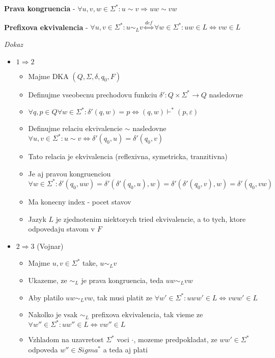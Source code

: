 \documentclass[12pt]{article}
\begin{document}
\textbf{Prava kongruencia} - $\forall u,v,w \in \Sigma^{*}: u \sim v \Rightarrow uw \sim vw$

\textbf{Prefixova ekvivalencia} - $\forall u,v \in \Sigma^{*}: u \sim_{L} v \overset{def}{\Leftrightarrow} \forall w \in \Sigma^{*}: uw \in L \Leftrightarrow vw \in L$

\emph{Dokaz}
\begin{itemize}
	\item $1 \Rightarrow 2$
		\begin{itemize}
			\item Majme DKA $(Q,\Sigma,\delta,q_{0},F)$
			\item Definujme vseobecnu prechodovu funkciu $\delta': Q \times \Sigma^{*} \to Q$ nasledovne
			\item $\forall q,p \in Q \forall w \in \Sigma^{*}: \delta'(q,w) = p \Leftrightarrow (q,w) \vdash^{*} (p, \varepsilon)$
			\item Definujme relaciu ekvivalencie $\sim$ nasledovne $\forall u,v \in \Sigma^{*}: u \sim v \Leftrightarrow \delta'(q_{0}, u) = \delta'(q_{0}, v)$
			\item Tato relacia je ekvivalencia (reflexivna, symetricka, tranzitivna)
			\item Je aj pravou kongruenciou
				\begin{equation*}
					\forall w \in \Sigma^{*}: \delta'(q_{0}, uw) = \delta'(\delta'(q_{0}, u), w) = \delta'(\delta'(q_{0}, v), w) = \delta'(q_{0}, vw)
				\end{equation*}
			\item Ma konecny index - pocet stavov
			\item Jazyk $L$ je zjednotenim niektorych tried ekvivalencie, a to tych, ktore odpovedaju stavom v $F$
		\end{itemize}
	\item $2 \Rightarrow 3$ (Vojnar)
		\begin{itemize}
			\item Majme $u,v \in \Sigma^{*}$ take, $u \sim_{L} v$
			\item Ukazeme, ze $\sim_{L}$ je prava kongruencia, teda $uw \sim_{L} vw$
			\item Aby platilo $uw \sim_{L} vw$, tak musi platit ze $\forall w' \in \Sigma^{*}: uww' \in L \Leftrightarrow vww' \in L$
			\item Nakolko je vsak $\sim_{L}$ prefixova ekvivalencia, tak vieme ze $\forall w'' \in \Sigma^{*}: uw'' \in L \Leftrightarrow vw'' \in L$
			\item Vzhladom na uzavretost $\Sigma^{*}$ voci $\cdot$, mozeme predpokladat, ze $ww' \in \Sigma^{*}$ odpoveda $w'' \in Sigma^{*}$ a teda aj plati

\end{itemize}
\end{itemize}
\end{document}
